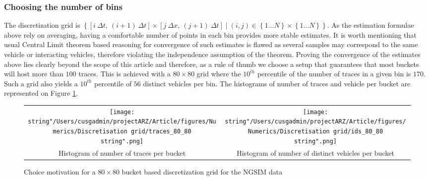 \documentclass[preprint]{elsarticle}
\begin{document}
\subsubsection{Choosing the number of bins}

The discretization grid is $\left\{ \left[i\:\Delta t,\:\left(i+1\right)\:\Delta t\right]\times\left[j\:\Delta x,\:\left(j+1\right)\:\Delta t\right]\mid\left(i,j\right)\in\left\{ 1\ldots N\right\} \times\left\{ 1\ldots N\right\} \right\} $.
As the estimation formulae above rely on averaging, having a comfortable
number of points in each bin provides more stable estimates. It is
worth mentioning that usual Central Limit theorem based reasoning
for convergence of such estimates is flawed as several samples may
correspond to the same vehicle or interacting vehicles, therefore
violating the independence assumption of the theorem. Proving the
convergence of the estimates above lies clearly beyond the scope of
this article and therefore, as a rule of thumb we choose a setup that
guarantees that most buckets will host more than $100$ traces. This
is achieved with a $80\times80$ grid where the $10^{th}$ percentile
of the number of traces in a given bin is $170$. Such a grid also
yields a $10^{th}$ percentile of $56$ distinct vehicles per bin.
The histograms of number of traces and vehicle per bucket are represented
on Figure \ref{fig:Grid control}.

\begin{figure}
\begin{centering}
\begin{tabular}{cc}
\texttt{[image: \\string"/Users/cusgadmin/projectARZ/Article/figures/Numerics/Discretisation grid/traces\_80\_80\\string".png]} & \texttt{[image: \\string"/Users/cusgadmin/projectARZ/Article/figures/Numerics/Discretisation grid/ids\_80\_80\\string".png]}\tabularnewline
Histogram of number of traces per bucket & Histogram of number of distinct vehicles per bucket\tabularnewline
\end{tabular}
\par\end{centering}

\protect\caption{Choice motivation for a $80\times80$ bucket based discretization
grid for the NGSIM data\label{fig:Grid control}}


\end{figure}
\end{document}
